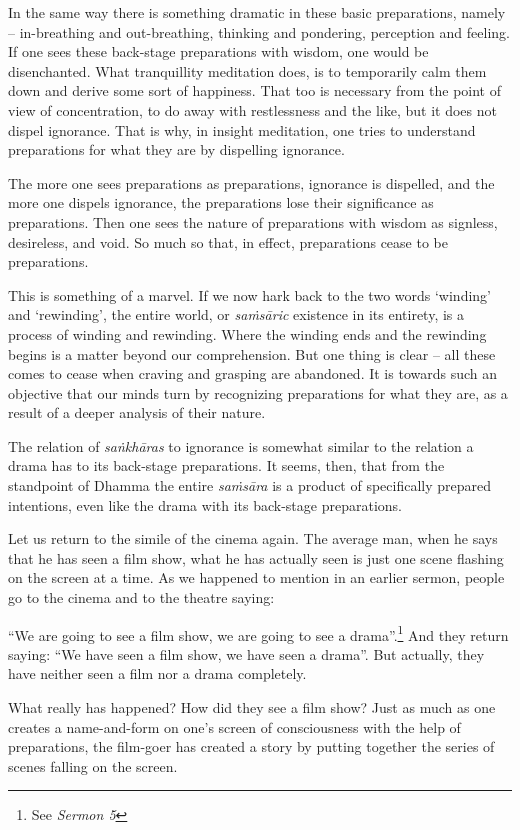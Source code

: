 In the same way there is something dramatic in these basic preparations, namely -- in-breathing and out-breathing, thinking and pondering, perception and feeling. If one sees these back-stage preparations with wisdom, one would be disenchanted. What tranquillity meditation does, is to temporarily calm them down and derive some sort of happiness. That too is necessary from the point of view of concentration, to do away with restlessness and the like, but it does not dispel ignorance. That is why, in insight meditation, one tries to understand preparations for what they are by dispelling ignorance.

The more one sees preparations as preparations, ignorance is dispelled, and the more one dispels ignorance, the preparations lose their significance as preparations. Then one sees the nature of preparations with wisdom as signless, desireless, and void. So much so that, in effect, preparations cease to be preparations.

This is something of a marvel. If we now hark back to the two words `winding' and `rewinding', the entire world, or \emph{saṁsāric} existence in its entirety, is a process of winding and rewinding. Where the winding ends and the rewinding begins is a matter beyond our comprehension. But one thing is clear -- all these comes to cease when craving and grasping are abandoned. It is towards such an objective that our minds turn by recognizing preparations for what they are, as a result of a deeper analysis of their nature.

The relation of \emph{saṅkhāras} to ignorance is somewhat similar to the relation a drama has to its back-stage preparations. It seems, then, that from the standpoint of Dhamma the entire \emph{saṁsāra} is a product of specifically prepared intentions, even like the drama with its back-stage preparations.

Let us return to the simile of the cinema again. The average man, when he says that he has seen a film show, what he has actually seen is just one scene flashing on the screen at a time. As we happened to mention in an earlier sermon, people go to the cinema and to the theatre saying:

``We are going to see a film show, we are going to see a drama''.\footnote{See \emph{Sermon 5}} And they return saying: ``We have seen a film show, we have seen a drama''. But actually, they have neither seen a film nor a drama completely.

What really has happened? How did they see a film show? Just as much as one creates a name-and-form on one's screen of consciousness with the help of preparations, the film-goer has created a story by putting together the series of scenes falling on the screen.

